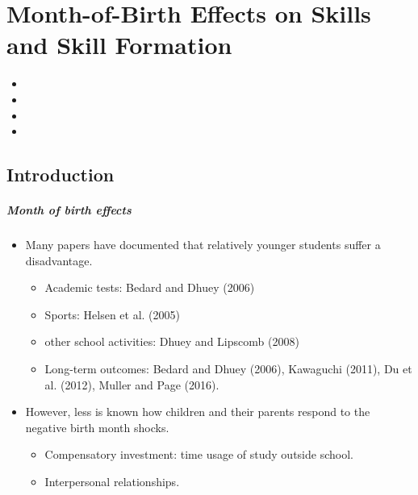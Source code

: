 \documentclass[../root]{subfiles}
\begin{document}
    \chapter{Month-of-Birth Effects on Skills and Skill Formation}

    \begin{shortsummary}
        \begin{itemize}
            \item {}
            \item {}
            \item {}
            \item {}
        \end{itemize}
    \end{shortsummary}

    \section{Introduction}

    \paragraph{Month of birth effects}

    \begin{itemize}
      \item Many papers have documented that relatively younger students suffer a disadvantage.
      \begin{itemize}
        \item Academic tests: Bedard and Dhuey (2006)
        \item Sports: Helsen et al. (2005)
        \item other school activities: Dhuey and Lipscomb (2008)
        \item Long-term outcomes: Bedard and Dhuey (2006), Kawaguchi (2011), Du et al. (2012), Muller and Page (2016).
      \end{itemize}
      \item However, less is known how children and their parents respond to the negative birth month shocks.
      \begin{itemize}
        \item Compensatory investment: time usage of study outside school.
        \item Interpersonal relationships.
      \end{itemize}
    \end{itemize}
\end{document}
